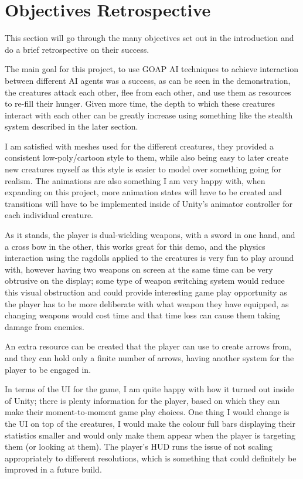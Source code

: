 \documentclass[11pt]{report}
\begin{document}
\section{Objectives Retrospective}
This section will go through the many objectives set out in the introduction and do a brief retrospective on their success.


The main goal for this project, to use GOAP AI techniques to achieve interaction between different AI agents was a success, as can be seen in the demonstration, the creatures attack each other, flee from each other, and use them as resources to re-fill their hunger. Given more time, the depth to which these creatures interact with each other can be greatly increase using something like the stealth system described in the later section.

I am satisfied with meshes used for the different creatures, they provided a consistent low-poly/cartoon style to them, while also being easy to later create new creatures myself as this style is easier to model over something going for realism. The animations are also something I am very happy with, when expanding on this project, more animation states will have to be created and transitions will have to be implemented inside of Unity's animator controller for each individual creature.

As it stands, the player is dual-wielding weapons, with a sword in one hand, and a cross bow in the other, this works great for this demo, and the physics interaction using the ragdolls applied to the creatures is very fun to play around with, however having two weapons on screen at the same time can be very obtrusive on the display; some type of weapon switching system would reduce this visual obstruction and could provide interesting game play opportunity as the player has to be more deliberate with what weapon they have equipped, as changing weapons would cost time and that time loss can cause them taking damage from enemies.

An extra resource can be created that the player can use to create arrows from, and they can hold only a finite number of arrows, having another system for the player to be engaged in.

In terms of the UI for the game, I am quite happy with how it turned out inside of Unity; there is plenty information for the player, based on which they can make their moment-to-moment game play choices. One thing I would change is the UI on top of the creatures, I would make the colour full bars displaying their statistics smaller and would only make them appear when the player is targeting them (or looking at them). The player's HUD runs the issue of not scaling appropriately to different resolutions, which is something that could definitely be improved in a future build.
\end{document}
